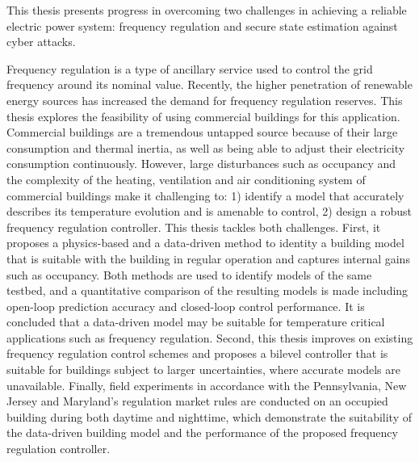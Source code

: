 \documentclass[12pt, oneside, final]{lib/ucthesis}
\begin{document}
\begin{frontmatter} 
\maketitle
\copyrightpage
\abstract
This thesis presents progress in overcoming two challenges in achieving a reliable electric power system: frequency regulation and secure state estimation against cyber attacks.

Frequency regulation is a type of ancillary service used to control the grid frequency around its nominal value.
Recently, the higher penetration of renewable energy sources has increased the demand for frequency regulation reserves. 
This thesis explores the feasibility of using commercial buildings for this application.
Commercial buildings are a tremendous untapped source because of their large consumption and thermal inertia, as well as being able to adjust their electricity consumption continuously.
However, large disturbances such as occupancy and the complexity of the heating, ventilation and air conditioning system of commercial buildings make it challenging to: 1) identify a model that accurately describes its temperature evolution and is amenable to control, 2) design a robust frequency regulation controller.
This thesis tackles both challenges.
First, it proposes a physics-based and a data-driven method to identity a building model that is suitable with the building in regular operation and captures internal gains such as occupancy.
Both methods are used to identify models of the same testbed, and a quantitative comparison of the resulting models is made including open-loop prediction accuracy and closed-loop control performance.
It is concluded that a data-driven model may be suitable for temperature critical applications such as frequency regulation.
Second, this thesis improves on existing frequency regulation control schemes and proposes a bilevel controller that is suitable for buildings subject to larger uncertainties, where accurate models are unavailable.
Finally, field experiments in accordance with the Pennsylvania, New Jersey and Maryland's regulation market rules are conducted on an occupied building during both daytime and nighttime, which demonstrate the suitability of the data-driven building model and the performance of the proposed frequency regulation controller.



\end{frontmatter}
\end{document}

